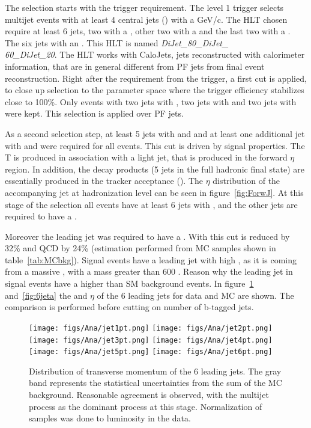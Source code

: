 The selection starts with the trigger requirement. The level 1 trigger selects multijet events  with at least 4 central jets () with a  GeV/c. The HLT chosen require at least 6 jets, two with a , other two with a  and the last two with a . The six jets with an . This HLT is named \textit{DiJet\_80\_DiJet\_\\60\_DiJet\_20}. The HLT works with CaloJets, jets reconstructed with calorimeter information, that are in general different from PF jets from final event reconstruction. Right after the requirement from the trigger, a first cut is applied, to close up selection to the parameter space where the trigger efficiency stabilizes close to 100\%. Only events with two jets with , two jets with  and two jets with  were kept. This selection is applied over PF jets. %

As a second selection step, at least 5 jets with  and  and at least one additional jet with  and  were required for all events. This cut is driven by signal properties. The T is produced in association with a light jet, that is produced in the forward $\eta$ region. In addition, the \Tp decay products (5 jets in the full hadronic final state) are essentially produced in the tracker acceptance (). The $\eta$ distribution of the accompanying jet at hadronization level can be seen in figure~\ref{fig:ForwJ}. At this stage of the selection all events have at least 6 jets with , and the other jets are required to have a . %

Moreover the leading jet was required to have a . With this cut \ttbar is reduced by 32\% and QCD by 24\% (estimation performed from MC samples shown in table~\ref{tab:MCbkg}). Signal events have a leading jet with high \pt, as it is coming from a massive \Tp, with a mass greater than 600 \GeVcc. Reason why the leading jet in signal events have a higher \pt than SM background events. In figure~\ref{fig:6jpt} and~\ref{fig:6jeta} the \pt and $\eta$ of the 6 leading jets for data and MC are shown. The comparison is performed before cutting on number of b-tagged jets.

\begin{figure}[!Hhtbp]
  \begin{center}
    \texttt{[image: figs/Ana/jet1pt.png]}
    \texttt{[image: figs/Ana/jet2pt.png]}
    \texttt{[image: figs/Ana/jet3pt.png]}
    \texttt{[image: figs/Ana/jet4pt.png]}
    \texttt{[image: figs/Ana/jet5pt.png]}
    \texttt{[image: figs/Ana/jet6pt.png]}
    \caption{Distribution of transverse momentum of the 6 leading jets. The gray band represents the statistical uncertainties from the sum of the MC background. Reasonable agreement is observed, with the multijet process as the dominant process at this stage. Normalization of samples was done to luminosity in the data.}
    \label{fig:6jpt}
  \end{center}
\end{figure}

